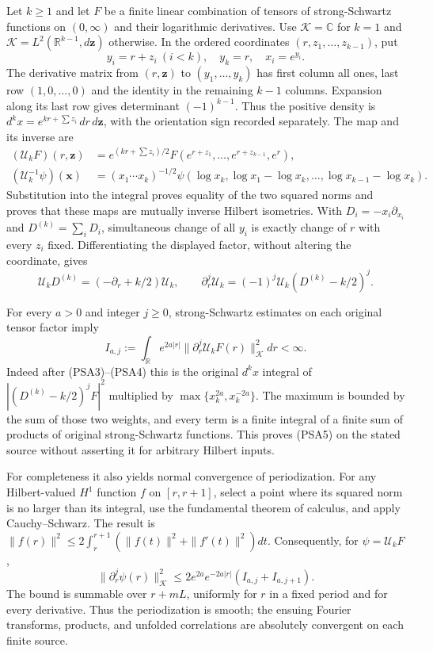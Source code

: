 Let $k\ge1$ and let $F$ be a finite linear combination of tensors of
strong-Schwartz functions on $(0,\infty)$ and their logarithmic
derivatives. Use $\mathcal K=\mathbb C$ for $k=1$ and
$\mathcal K=L^2(\mathbb R^{k-1},d\mathbf z)$ otherwise. In the ordered
coordinates $(r,z_1,\ldots,z_{k-1})$, put
\[
 y_i=r+z_i\ (i<k),\quad y_k=r,\quad x_i=e^{y_i}.
 \tag{PSA2}
\]
The derivative matrix from $(r,\mathbf z)$ to $(y_1,\ldots,y_k)$ has
first column all ones, last row $(1,0,\ldots,0)$ and the identity in the
remaining $k-1$ columns. Expansion along its last row gives determinant
$(-1)^{k-1}$. Thus the positive density is
$d^kx=e^{kr+\sum z_i}\,dr\,d\mathbf z$, with the orientation sign
recorded separately. The map and its inverse are
\[
 \begin{split}
 (\mathcal U_k F)(r,\mathbf z)
 &=e^{(kr+\sum z_i)/2}F(e^{r+z_1},\ldots,e^{r+z_{k-1}},e^r),\\
 (\mathcal U_k^{-1}\psi)(\mathbf x)
 &=(x_1\cdots x_k)^{-1/2}
 \psi(\log x_k,\log x_1-\log x_k,\ldots,
                  \log x_{k-1}-\log x_k).
 \end{split}
 \tag{PSA3}
\]
Substitution into the integral proves equality of the two squared
norms and proves that these maps are mutually inverse Hilbert
isometries. With $D_i=-x_i\partial_{x_i}$ and
$D^{(k)}=\sum_iD_i$, simultaneous change of all $y_i$ is exactly
change of $r$ with every $z_i$ fixed. Differentiating the displayed
factor, without altering the coordinate, gives
\[
 \mathcal U_kD^{(k)}=(-\partial_r+k/2)\mathcal U_k,
 \qquad
 \partial_r^j\mathcal U_k
 =(-1)^j\mathcal U_k(D^{(k)}-k/2)^j.
 \tag{PSA4}
\]

For every $a>0$ and integer $j\ge0$, strong-Schwartz estimates on each
original tensor factor imply
\[
 I_{a,j}:=\int_{\mathbb R} e^{2a|r|}
       \|\partial_r^j\mathcal U_kF(r)\|_{\mathcal K}^2dr<\infty.
 \tag{PSA5}
\]
Indeed after (PSA3)--(PSA4) this is the original $d^kx$ integral of
$|(D^{(k)}-k/2)^jF|^2$ multiplied by
$\max\{x_k^{2a},x_k^{-2a}\}$. The maximum is bounded by the sum of
those two weights, and every term is a finite integral of a finite sum
of products of original strong-Schwartz functions. This proves (PSA5)
on the stated source without asserting it for arbitrary Hilbert inputs.

For completeness it also yields normal convergence of periodization.
For any Hilbert-valued $H^1$ function $f$ on $[r,r+1]$, select a point
where its squared norm is no larger than its integral, use the
fundamental theorem of calculus, and apply Cauchy--Schwarz. The result is
$\|f(r)\|^2\le2\int_r^{r+1}(\|f(t)\|^2+\|f'(t)\|^2)dt$.
Consequently, for $\psi=\mathcal U_kF$,
\[
 \|\partial_r^j\psi(r)\|_{\mathcal K}^2
 \le 2e^{2a}e^{-2a|r|}(I_{a,j}+I_{a,j+1}).
 \tag{PSA6}
\]
The bound is summable over $r+mL$, uniformly for $r$ in a fixed
period and for every derivative. Thus the periodization is smooth;
the ensuing Fourier transforms, products, and unfolded correlations
are absolutely convergent on each finite source.

